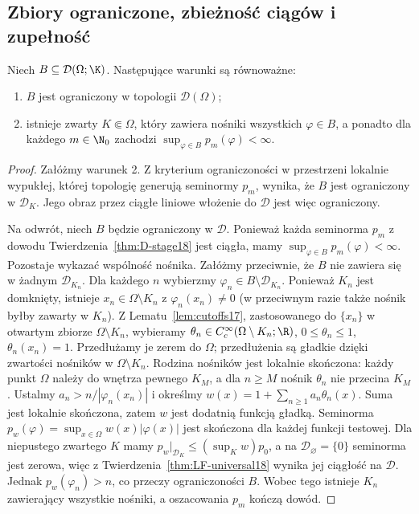 \subsection{Zbiory ograniczone, zbieżność ciągów i zupełność}

\begin{twierdzenie}
\label{thm:D-bounded18}
Niech $B\subseteq\mathcal D(\Omega;\K)$. Następujące
warunki są równoważne:
\begin{enumerate}
\item $B$ jest ograniczony w topologii $\mathcal D(\Omega)$;
\item istnieje zwarty $K\Subset\Omega$, który zawiera
nośniki wszystkich $\varphi\in B$, a ponadto dla każdego
$m\in\N_0$ zachodzi $\sup_{\varphi\in B}p_m(\varphi)<\infty$.
\end{enumerate}
\end{twierdzenie}
\begin{proof}
Załóżmy warunek 2. Z kryterium ograniczoności w przestrzeni
lokalnie wypukłej, której topologię generują seminormy $p_m$,
wynika, że $B$ jest ograniczony w $\mathcal D_K$.
Jego obraz przez ciągłe liniowe włożenie do $\mathcal D$
jest więc ograniczony.

Na odwrót, niech $B$ będzie ograniczony w $\mathcal D$.
Ponieważ każda seminorma $p_m$ z dowodu
Twierdzenia~\ref{thm:D-stage18} jest ciągła, mamy
$\sup_{\varphi\in B}p_m(\varphi)<\infty$.
Pozostaje wykazać wspólność nośnika. Załóżmy przeciwnie,
że $B$ nie zawiera się w żadnym $\mathcal D_{K_n}$.
Dla każdego $n$ wybierzmy $\varphi_n\in B\setminus\mathcal D_{K_n}$.
Ponieważ $K_n$ jest domknięty, istnieje
$x_n\in\Omega\setminus K_n$ z $\varphi_n(x_n)\ne0$
(w przeciwnym razie także nośnik byłby zawarty w $K_n$).
Z Lematu~\ref{lem:cutoffs17}, zastosowanego do $\{x_n\}$
w otwartym zbiorze $\Omega\setminus K_n$, wybieramy
$\theta_n\in C_c^\infty(\Omega\setminus K_n;\R)$,
$0\le\theta_n\le1$, $\theta_n(x_n)=1$.
Przedłużamy je zerem do $\Omega$; przedłużenia są gładkie
dzięki zwartości nośników w $\Omega\setminus K_n$.
Rodzina nośników jest lokalnie skończona: każdy punkt
$\Omega$ należy do wnętrza pewnego $K_M$, a dla $n\ge M$
nośnik $\theta_n$ nie przecina $K_M$. Ustalmy $a_n>n/|\varphi_n(x_n)|$ i określmy
$w(x)=1+\sum_{n\ge1}a_n\theta_n(x)$. Suma jest lokalnie
skończona, zatem $w$ jest dodatnią funkcją gładką.
Seminorma $p_w(\varphi)=\sup_{x\in\Omega}w(x)|\varphi(x)|$
jest skończona dla każdej funkcji testowej. Dla niepustego zwartego
$K$ mamy $p_w|_{\mathcal D_K}\le(\sup_Kw)p_0$,
a na $\mathcal D_\varnothing=\{0\}$ seminorma jest zerowa, więc
z Twierdzenia~\ref{thm:LF-universal18} wynika jej ciągłość
na $\mathcal D$. Jednak $p_w(\varphi_n)>n$,
co przeczy ograniczoności $B$. Wobec tego istnieje
$K_n$ zawierający wszystkie nośniki, a oszacowania
$p_m$ kończą dowód.
\end{proof}

